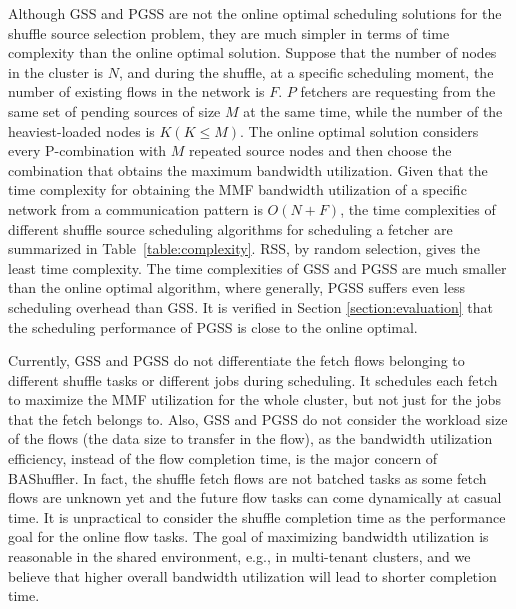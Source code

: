 \documentclass[10pt,journal,compsoc]{IEEEtran}
\begin{document}
Although GSS and PGSS are not the online optimal scheduling solutions for the
shuffle source selection problem,
they are much simpler in terms of time complexity than the online
optimal solution. 
Suppose that the number of nodes in the cluster is $N$,
and during the shuffle, at a specific scheduling moment, 
the number of existing flows in the network is $F$.
$P$ fetchers are
requesting from the same set of pending sources of size $M$ at the same time, 
while the number of the heaviest-loaded nodes is $K(K \leq M)$.
The online optimal solution considers every P-combination with $M$ repeated source nodes and then choose the combination that obtains the maximum bandwidth utilization.  
Given that the time complexity for obtaining the MMF
bandwidth utilization
of a specific network from a communication pattern is $O(N+F)$, 
the time complexities of different shuffle source scheduling algorithms for scheduling a
fetcher are summarized in Table~\ref{table:complexity}.
RSS, by random selection, gives the least time complexity. 
The time complexities of GSS and PGSS are much smaller than the online optimal algorithm, where generally, PGSS suffers even less scheduling overhead than GSS. 
It is verified in Section \ref{section:evaluation} that the scheduling
performance of PGSS is close to the online optimal.

Currently, GSS and PGSS do not differentiate the fetch flows belonging to different shuffle tasks or different jobs during scheduling. 
It schedules each fetch to maximize the MMF utilization for the whole cluster, but not just for the jobs that the fetch belongs to. 
Also, GSS and PGSS do not consider the workload size of the flows (the data size to transfer in the flow), as the bandwidth utilization efficiency, instead of the flow completion time, is the major concern of BAShuffler. 
In fact, the shuffle fetch flows are not batched tasks as some fetch flows are unknown yet and the future flow tasks can come dynamically at casual time.
It is unpractical to consider the shuffle completion time as the performance goal for the online flow tasks.
The goal of maximizing bandwidth utilization is reasonable in the shared environment, e.g., in multi-tenant clusters, and we believe that higher overall bandwidth utilization will lead to shorter completion time.


\end{document}
